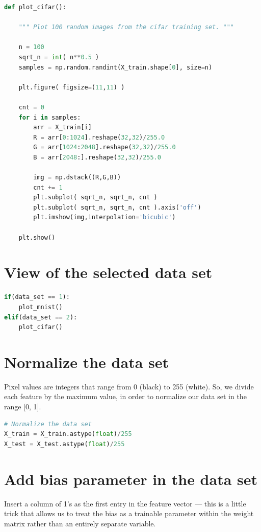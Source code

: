 \documentclass[11pt]{article}
\begin{document}
\begin{lstlisting}[language = Python]
def plot_cifar():
    
    """ Plot 100 random images from the cifar training set. """  
    
    n = 100
    sqrt_n = int( n**0.5 )
    samples = np.random.randint(X_train.shape[0], size=n)

    plt.figure( figsize=(11,11) )

    cnt = 0
    for i in samples:
        arr = X_train[i]
        R = arr[0:1024].reshape(32,32)/255.0
        G = arr[1024:2048].reshape(32,32)/255.0
        B = arr[2048:].reshape(32,32)/255.0

        img = np.dstack((R,G,B))
        cnt += 1
        plt.subplot( sqrt_n, sqrt_n, cnt )
        plt.subplot( sqrt_n, sqrt_n, cnt ).axis('off')
        plt.imshow(img,interpolation='bicubic')

    plt.show()
\end{lstlisting}

\newpage
\section{View of the selected data set}

\begin{lstlisting}[language = Python]
if(data_set == 1):
    plot_mnist()
elif(data_set == 2):
    plot_cifar()
\end{lstlisting}
\hfill

\hfill

\section{Normalize the data set }
Pixel values are integers that range from 0 (black) to 255 (white). So, we divide each feature by the maximum value, in order to normalize our data set in the range [0, 1]. \\

\begin{lstlisting}[language = Python]
# Normalize the data set
X_train = X_train.astype(float)/255
X_test = X_test.astype(float)/255
\end{lstlisting}
\hfill


\section{Add bias parameter in the data set}
Insert a column of 1's as the first entry in the feature vector --- this is a little trick that allows us to treat
the bias as a trainable parameter within the weight matrix rather than an entirely separate variable. \\
\end{document}
